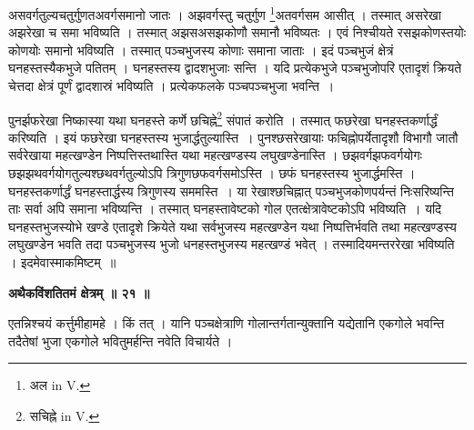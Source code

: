 \documentclass[11pt, openany]{book}
\begin{document}
\newpage
\noindent असवर्गतुल्यचतुर्गुणतअवर्गसमानो जातः । अझवर्गस्तु चतुर्गुण \renewcommand{\thefootnote}{१}\footnote{अल {\en in V.}}अतवर्गसम आसीत् । तस्मात् असरेखा अझरेखा च समा भविष्यति । तस्मात् अझसअसझकोणौ समानौ भविष्यतः । एवं
निश्चीयते रसझकोणस्तयोः कोणयोः समानो भविष्यति । तस्मात्
पञ्चभुजस्य कोणाः समाना जाताः । इदं पञ्चभुजं क्षेत्रं घनहस्तस्यैकभुजे पतितम् । घनहस्तस्य द्वादशभुजाः सन्ति । यदि प्रत्येकभुजे पञ्चभुजोपरि एतादृशं क्रियते चेत्तदा क्षेत्रं पूर्णं द्वादशास्रं भविष्यति । प्रत्येकफलके पञ्चपञ्चभुजा भवन्ति~।\\
\vspace{10mm}


पुनर्झफरेखा निष्कास्या यथा घनहस्ते कर्णे छचिह्ने\renewcommand{\thefootnote}{२}\footnote{सचिह्ने {\en in V.}} संपातं करोति । तस्मात् फछरेखा घनहस्तकर्णार्द्धं करिष्यति । इयं फछरेखा घनहस्तस्य भुजार्द्धतुल्यास्ति~। पुनश्छसरेखायाः फचिह्नोपर्येतादृशौ विभागौ जातौ सर्वरेखाया महत्खण्डेन निष्पत्तिस्तथास्ति यथा महत्खण्डस्य लघुखण्डेनास्ति । छझवर्गझफवर्गयोगः छझझथवर्गयोगतुल्यश्छथवर्गतुल्योऽपि त्रिगुणछफवर्गसमोऽस्ति । छफं घनहस्तस्य भुजार्द्धमस्ति । घनहस्तकर्णार्द्धं घनहस्तार्द्धस्य त्रिगुणस्य सममस्ति~। या रेखाश्छचिह्नात् पञ्चभुजकोणपर्यन्तं निःसरिष्यन्ति ताः सर्वा अपि समाना भविष्यन्ति । तस्मात् घनहस्तावेष्टको गोल एतत्क्षेत्रावेष्टकोऽपि भविष्यति~। यदि घनहस्तभुजस्योभे खण्डे एतादृशे क्रियेते यथा सर्वभुजस्य महत्खण्डेन यथा निष्पत्तिर्भवति तथा महत्खण्डस्य लघुखण्डेन भवति तदा पञ्चभुजस्य भुजो धनहस्तभुजस्य महत्खण्डं भवेत् । तस्मादियमन्तररेखा भविष्यति । इदमेवास्माकमिष्टम्~॥\\
\vspace{3mm}

\begin{center}
\textbf{\large अथैकविंशतितमं क्षेत्रम् ॥ २१ ॥ }
\end{center}
\vspace{5mm}

{\ab एतन्निश्चयं कर्त्तुमीहामहे । किं तत् । यानि पञ्चक्षेत्राणि गोलान्तर्गतान्युक्तानि यद्येतानि एकगोले भवन्ति तदैतेषां भुजा एकगोले भवितुमर्हन्ति नवेति विचार्यते । }\\
\end{document}
